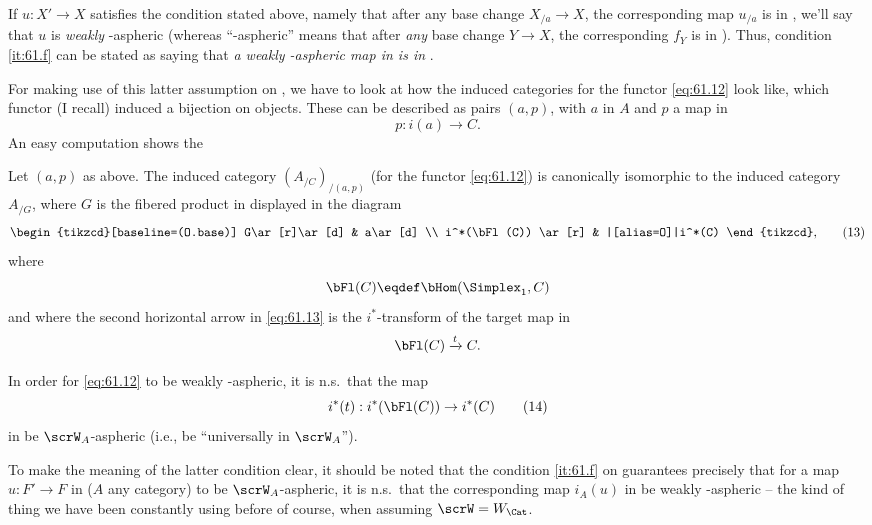 If $u:X'\to X$ satisfies the condition stated above, namely that after
any base change $X_{/a}\to X$, the corresponding map $u_{/a}$ is in
\scrW, we'll say that $u$ is \emph{weakly} \scrW-aspheric (whereas
``\scrW-aspheric'' means that after \emph{any} base change $Y\to X$,
the corresponding $f_Y$ is in \scrW). Thus, condition \ref{it:61.f}
can be stated as saying that \emph{a weakly \scrW-aspheric map in
  \Cat{} is in \scrW}.

For making use of this latter assumption on \scrW, we have to look at
how the induced categories for the functor \eqref{eq:61.12} look like,
which functor (I recall) induced a bijection on objects. These can be
described as pairs $(a,p)$, with $a$ in $A$ and $p$ a map in \Cat
\[p:i(a)\to C.\]
An easy computation shows the
\begin{lemma}
  Let $(a,p)$ as above. The induced category $(A_{/C})_{/(a,p)}$
  \textup(for the functor \textup{\eqref{eq:61.12})} is canonically
  isomorphic to the induced category $A_{/G}$, where $G$ is the
  fibered product in \Ahat{} displayed in the diagram
  \begin{equation}
    \label{eq:61.13}
    \begin{tabular}{@{}c@{}}
    \begin{tikzcd}[baseline=(O.base)]
      G\ar[r]\ar[d] & a\ar[d] \\
      i^*(\bFl(C)) \ar[r] & |[alias=O]|i^*(C)
    \end{tikzcd},
    \end{tabular}
    \tag{13}
  \end{equation}
  where
  \[\bFl(C)\eqdef \bHom(\Simplex_1,C)\]
  and where the second horizontal arrow in \textup{\eqref{eq:61.13}}
  is the $i^*$-transform of the target map in \Cat
  \[\bFl(C) \xrightarrow t C.\]
\end{lemma}
\begin{corollary}
  In order for \textup{\eqref{eq:61.12}} to be weakly \scrW-aspheric,
  it is n.s.\ that the map
  \begin{equation}
    \label{eq:61.14}
    i^*(t) : i^*(\bFl(C)) \to i^*(C)\tag{14}
  \end{equation}
  in \Ahat{} be $\scrW_A$-aspheric \textup(i.e., be ``universally in $\scrW_A$''\textup).
\end{corollary}

To make the meaning of the latter condition clear, it should be noted
that the condition \ref{it:61.f} on \scrW{} guarantees precisely that
for a map $u:F'\to F$ in \Ahat{} ($A$ any category) to be
$\scrW_A$-aspheric, it is n.s.\ that the corresponding map $i_A(u)$ in
\Cat{} be weakly \scrW-aspheric -- the kind of thing we have been
constantly using before of course, when assuming
$\scrW=W_\Cat$.

